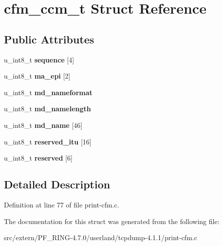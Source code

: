 \hypertarget{structcfm__ccm__t}{
\section{cfm\_\-ccm\_\-t Struct Reference}
\label{structcfm__ccm__t}
}
\subsection*{Public Attributes}
\begin{DoxyCompactItemize}
\item 
\hypertarget{structcfm__ccm__t_a810eec1641939894524bf78a1fb86436}{
u\_\-int8\_\-t {\bfseries sequence} \mbox{[}4\mbox{]}}
\label{structcfm__ccm__t_a810eec1641939894524bf78a1fb86436}

\item 
\hypertarget{structcfm__ccm__t_a615944c4af1c8ab580d0b0814a9ddc1d}{
u\_\-int8\_\-t {\bfseries ma\_\-epi} \mbox{[}2\mbox{]}}
\label{structcfm__ccm__t_a615944c4af1c8ab580d0b0814a9ddc1d}

\item 
\hypertarget{structcfm__ccm__t_ac1938ddbd240fa93ffa9114a3f7918c7}{
u\_\-int8\_\-t {\bfseries md\_\-nameformat}}
\label{structcfm__ccm__t_ac1938ddbd240fa93ffa9114a3f7918c7}

\item 
\hypertarget{structcfm__ccm__t_a5a94766c64726d538f1bf551f1319c02}{
u\_\-int8\_\-t {\bfseries md\_\-namelength}}
\label{structcfm__ccm__t_a5a94766c64726d538f1bf551f1319c02}

\item 
\hypertarget{structcfm__ccm__t_a2b1681b035624c7efbee4e7f56c4d048}{
u\_\-int8\_\-t {\bfseries md\_\-name} \mbox{[}46\mbox{]}}
\label{structcfm__ccm__t_a2b1681b035624c7efbee4e7f56c4d048}

\item 
\hypertarget{structcfm__ccm__t_a298ad08aee140996e312ea144d8a2a9e}{
u\_\-int8\_\-t {\bfseries reserved\_\-itu} \mbox{[}16\mbox{]}}
\label{structcfm__ccm__t_a298ad08aee140996e312ea144d8a2a9e}

\item 
\hypertarget{structcfm__ccm__t_a678238fe24ca81515310077538319729}{
u\_\-int8\_\-t {\bfseries reserved} \mbox{[}6\mbox{]}}
\label{structcfm__ccm__t_a678238fe24ca81515310077538319729}

\end{DoxyCompactItemize}


\subsection{Detailed Description}


Definition at line 77 of file print-\/cfm.c.



The documentation for this struct was generated from the following file:\begin{DoxyCompactItemize}
\item 
src/extern/PF\_\-RING-\/4.7.0/userland/tcpdump-\/4.1.1/print-\/cfm.c\end{DoxyCompactItemize}
